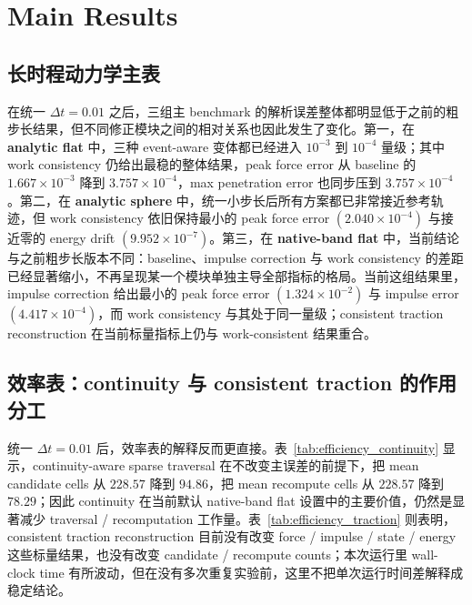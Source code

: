 \section{Main Results}
\subsection{长时程动力学主表}


在统一 $\Delta t = 0.01$ 之后，三组主 benchmark 的解析误差整体都明显低于之前的粗步长结果，但不同修正模块之间的相对关系也因此发生了变化。第一，在 \textbf{analytic flat} 中，三种 event-aware 变体都已经进入 $10^{-3}$ 到 $10^{-4}$ 量级；其中 work consistency 仍给出最稳的整体结果，peak force error 从 baseline 的 $1.667\times 10^{-3}$ 降到 $3.757\times 10^{-4}$，max penetration error 也同步压到 $3.757\times 10^{-4}$。第二，在 \textbf{analytic sphere} 中，统一小步长后所有方案都已非常接近参考轨迹，但 work consistency 依旧保持最小的 peak force error $\left(2.040\times 10^{-4}\right)$ 与接近零的 energy drift $\left(9.952\times 10^{-7}\right)$。第三，在 \textbf{native-band flat} 中，当前结论与之前粗步长版本不同：baseline、impulse correction 与 work consistency 的差距已经显著缩小，不再呈现某一个模块单独主导全部指标的格局。当前这组结果里，impulse correction 给出最小的 peak force error $\left(1.324\times 10^{-2}\right)$ 与 impulse error $\left(4.417\times 10^{-4}\right)$，而 work consistency 与其处于同一量级；consistent traction reconstruction 在当前标量指标上仍与 work-consistent 结果重合。

\subsection{效率表：continuity 与 consistent traction 的作用分工}



统一 $\Delta t = 0.01$ 后，效率表的解释反而更直接。表~\ref{tab:efficiency_continuity} 显示，continuity-aware sparse traversal 在不改变主误差的前提下，把 mean candidate cells 从 $228.57$ 降到 $94.86$，把 mean recompute cells 从 $228.57$ 降到 $78.29$；因此 continuity 在当前默认 native-band flat 设置中的主要价值，仍然是显著减少 traversal / recomputation 工作量。表~\ref{tab:efficiency_traction} 则表明，consistent traction reconstruction 目前没有改变 force / impulse / state / energy 这些标量结果，也没有改变 candidate / recompute counts；本次运行里 wall-clock time 有所波动，但在没有多次重复实验前，这里不把单次运行时间差解释成稳定结论。

